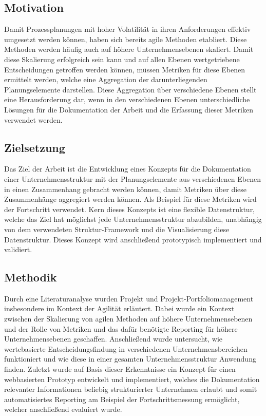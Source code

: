 \subsection{Motivation}
Damit Prozessplanungen mit hoher Volatilität in ihren Anforderungen effektiv umgesetzt werden können, haben sich bereits agile Methoden etabliert. Diese Methoden werden häufig auch auf höhere Unternehmensebenen skaliert. Damit diese Skalierung erfolgreich sein kann und auf allen Ebenen wertgetriebene Entscheidungen getroffen werden können, müssen Metriken für diese Ebenen ermittelt werden, welche eine Aggregation der darunterliegenden Planungselemente darstellen. Diese Aggregation über verschiedene Ebenen stellt eine Herausforderung dar, wenn in den verschiedenen Ebenen unterschiedliche Lösungen für die Dokumentation der Arbeit und die Erfassung dieser Metriken verwendet werden.

\subsection{Zielsetzung}
Das Ziel der Arbeit ist die Entwicklung eines Konzepts für die Dokumentation einer Unternehmensstruktur mit der Planungselemente aus verschiedenen Ebenen in einen Zusammenhang gebracht werden können, damit Metriken über diese Zusammenhänge aggregiert werden können. Als Beispiel für diese Metriken wird der Fortschritt verwendet. Kern dieses Konzepts ist eine flexible Datenstruktur, welche das Ziel hat möglichst jede Unternehmensstruktur abzubilden, unabhängig von dem verwendeten Struktur-Framework und die Visualisierung diese Datenstruktur. Dieses Konzept wird anschließend prototypisch implementiert und validiert.

\subsection{Methodik}
Durch eine Literaturanalyse wurden Projekt und Projekt-Portfoliomanagement insbesondere im Kontext der Agilität erläutert. Dabei wurde ein Kontext zwischen der Skalierung von agilen Methoden auf höhere Unternehmensebenen und der Rolle von Metriken und das dafür benötigte Reporting für höhere Unternehmensebenen geschaffen. Anschließend wurde untersucht, wie wertebasierte Entscheidungsfindung in verschiedenen Unternehmensbereichen funktioniert und wie diese in einer gesamten Unternehmensstruktur Anwendung finden. Zuletzt wurde auf Basis dieser Erkenntnisse ein Konzept für einen webbasierten Prototyp entwickelt und implementiert, welches die Dokumentation relevanter Informationen beliebig strukturierter Unternehmen erlaubt und somit automatisiertes Reporting am Beispiel der Fortschrittsmessung ermöglicht, welcher anschließend evaluiert wurde.

